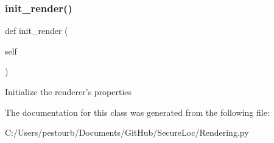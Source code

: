 \subsubsection{\texorpdfstring{init\+\_\+render()}{init\_render()}}
{\footnotesize\ttfamily def init\+\_\+render (\begin{DoxyParamCaption}\item[{}]{self }\end{DoxyParamCaption})}

\begin{DoxyVerb}Initialize the renderer's properties\end{DoxyVerb}
 

The documentation for this class was generated from the following file\+:\begin{DoxyCompactItemize}
\item 
C\+:/\+Users/pestourb/\+Documents/\+Git\+Hub/\+Secure\+Loc/Rendering.\+py\end{DoxyCompactItemize}
